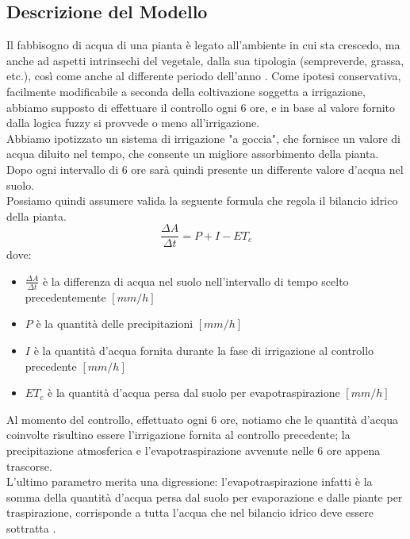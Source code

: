 \documentclass[conference,10pt]{IEEEtran}
\begin{document}
\subsection{Descrizione del Modello}\label{sec:symo}
Il fabbisogno di acqua di una pianta è legato all'ambiente in cui sta crescedo, ma anche ad aspetti intrinsechi del vegetale, dalla sua tipologia (sempreverde, grassa, etc.), così come anche al differente periodo dell'anno \cite{3}.
Come ipotesi conservativa, facilmente modificabile a seconda della coltivazione soggetta a irrigazione, abbiamo supposto di effettuare il controllo ogni 6 ore, e in base al valore fornito dalla logica fuzzy si provvede o meno all'irrigazione.\\
Abbiamo ipotizzato un sistema di irrigazione "a goccia", che fornisce un valore di acqua diluito nel tempo, che consente un migliore assorbimento della pianta. \\
Dopo ogni intervallo di 6 ore sarà quindi presente un differente valore d'acqua nel suolo.\\ Possiamo quindi assumere valida la seguente formula che regola il bilancio idrico della pianta.
\begin{equation*}
\frac{\Delta A}{\Delta t} = P + I - ET_c
\end{equation*}
dove:
\begin{itemize}
	\item $\frac{\Delta A}{\Delta t}$ è la differenza di acqua nel suolo nell'intervallo di tempo scelto precedentemente $[mm/h]$
	\item $P$ è la quantità delle precipitazioni $[mm/h]$ 
	\item $I$ è la quantità d'acqua fornita durante la fase di irrigazione al controllo precedente $[mm/h]$
	\item $ET_c$ è la quantità d'acqua persa dal suolo per evapotraspirazione $[mm/h]$
	\newline
\end{itemize}
Al momento del controllo, effettuato ogni 6 ore, notiamo che le quantità d'acqua coinvolte risultino essere l'irrigazione fornita al controllo precedente; la precipitazione atmosferica e l'evapotraspirazione avvenute nelle 6 ore appena trascorse.\\
L'ultimo parametro merita una digressione: l'evapotraspirazione infatti è la somma della quantità d’acqua persa dal suolo per evaporazione e dalle piante per traspirazione, corrisponde a tutta l'acqua che nel bilancio idrico deve essere sottratta \cite{6}. \\
\end{document}
